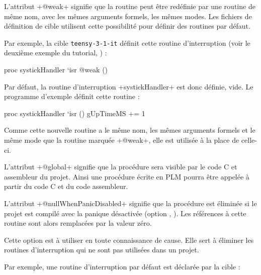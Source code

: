 
L'attribut \plm+@weak+ signifie que la routine peut être redéfinie par une routine de même nom, avec les mêmes arguments formels, les mêmes modes. Les fichiers de définition de cible utilisent cette possibilité pour définir des routines par défaut.

Par exemple, la cible \texttt{teensy-3-1-it} définit cette routine d'interruption (voir le deuxième exemple du tutorial, ) :

\begin{PLM}
proc systickHandler `isr @weak () {
}
\end{PLM}

Par défaut, la routine d'interruption \plm+systickHandler+ est donc définie, vide. Le programme d'exemple définit cette routine :

\begin{PLM}
proc systickHandler `isr () {
  gUpTimeMS += 1
}
\end{PLM}

Comme cette nouvelle routine a le même nom, les mêmes arguments formels et le même mode que la routine marquée \plm+@weak+, elle est utilisée à la place de celle-ci.







L'attribut \plm+@global+ signifie que la procédure sera visible par le code C et assembleur du projet. Ainsi une procédure écrite en PLM pourra être appelée à partir du code C et du code assembleur.







L'attribut \plm+@nullWhenPanicDisabled+ signifie que la procédure est éliminée si le projet est compilé avec la panique désactivée (option , ). Les références à cette routine sont alors remplacées par la valeur zéro.

Cette option est à utiliser en toute connaissance de cause. Elle sert à éliminer les routines d'interruption qui ne sont pas utilisées dans un projet.

Par exemple, une routine d'interruption par défaut est déclarée par la cible :

